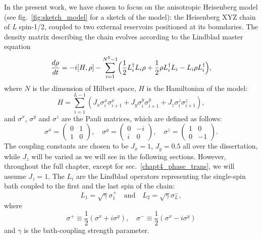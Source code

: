 In the present work, we have chosen to focus on the anisotropic Heisenberg model (see fig.~\ref{fig:sketch_model} for a sketch of the model): the Heisenberg XYZ chain of \textit{L} spin-1/2, coupled to two external reservoirs positioned at its boundaries. The density matrix describing the chain evolves according to the Lindblad master equation
\begin{equation}
    \frac{d\rho}{dt} = -i[H, \rho] - \sum_{i=1}^{N^2-1}\Bigl(\frac{1}{2}L_i^{\dagger}L_i\rho + \frac{1}{2}\rho L_i^{\dagger}L_i - L_i\rho L_i^{\dagger}\Bigl),
\end{equation}
where $N$ is the dimension of Hilbert space, $H$ is the Hamiltonian of the model:
\begin{equation}
\label{ham_chain}
    H = \sum_{i = 1}^{L-1} (J_x \sigma_i^x \sigma_{i+1}^x + J_y \sigma_i^y \sigma_{i+1}^y + J_z \sigma_i^z \sigma_{i+1}^z),
\end{equation}
and $\sigma^x$, $\sigma^y$ and $\sigma^z$ are the Pauli matrices, which are defined as follows:
\begin{equation}
\sigma^x = 
    \begin{pmatrix}
        0 & 1 \\
        1 & 0
    \end{pmatrix}
    , \quad \sigma^y = 
    \begin{pmatrix}
        0 & -i \\
        i & 0
    \end{pmatrix}
    , \quad \sigma^z = 
    \begin{pmatrix}
        1 & 0 \\
        0 & -1
    \end{pmatrix}
    .
\end{equation}
The coupling constants are chosen to be $J_x = 1$, $J_y = 0.5$ all over the dissertation, while $J_z$ will be varied as we will see in the following sections. However, throughout the full chapter, except for sec.~\ref{chapt4_phase_trans}, we will assume $J_z=1$.
The $L_i$ are the Lindblad operators representing the single-spin bath coupled to the first and the last spin of the chain:
\begin{equation}
\label{dissipators}
    L_1 = \sqrt{\gamma} \sigma_1^+ \quad \text{and} \quad L_2 =\sqrt{\gamma}\sigma_L^-,
\end{equation}
where 
\begin{equation*}
    \sigma^+ \equiv \frac{1}{2}(\sigma^x + i\sigma^y), \quad \sigma^- \equiv \frac{1}{2}(\sigma^x - i\sigma^y)
\end{equation*}
and $\gamma$ is the bath-coupling strength parameter.

